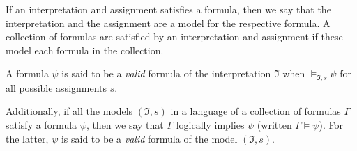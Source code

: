 \begin{definition}
If an interpretation and assignment satisfies a formula, then we say that the interpretation and the assignment are a model for the respective formula. A collection of formulas are satisfied by an interpretation and assignment if these model each formula in the collection.

A formula $\psi$ is said to be a \emph{valid} 
formula of the interpretation $\mathfrak{I}$ 
when $\models_{\mathfrak{I}, s} \psi$ for all 
possible assignments $s$.

Additionally, if all the models $(\mathfrak{I},
s)$ in a language of a collection of formulas 
$\Gamma$ satisfy a formula $\psi$, then we say 
that $\Gamma$ logically implies $\psi$ 
(written $\Gamma \models \psi$). For the 
latter, $\psi$ is said to be a \emph{valid} 
formula of the model $(\mathfrak{I}, s)$.

\end{definition}

